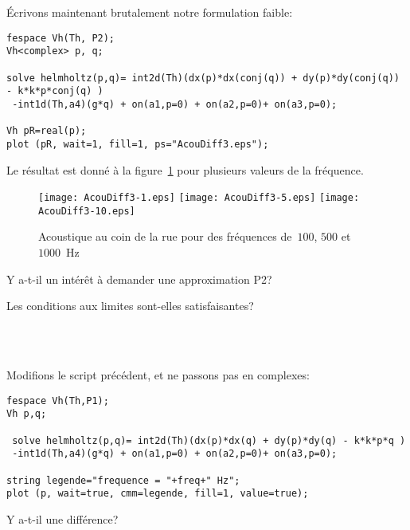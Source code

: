 \medskip
Écrivons maintenant brutalement notre formulation faible:
\begin{lstlisting}[firstnumber=last]
fespace Vh(Th, P2);
Vh<complex> p, q;

solve helmholtz(p,q)= int2d(Th)(dx(p)*dx(conj(q)) + dy(p)*dy(conj(q)) - k*k*p*conj(q) )
 -int1d(Th,a4)(g*q) + on(a1,p=0) + on(a2,p=0)+ on(a3,p=0);
 
Vh pR=real(p);
plot (pR, wait=1, fill=1, ps="AcouDiff3.eps");
\end{lstlisting}
Le résultat est donné à la figure~\ref{Fig-AcouDiff3} pour plusieurs valeurs de la fréquence.
\begin{figure}[h!]
\centering
   \texttt{[image: AcouDiff3-1.eps]}\hfill
   \texttt{[image: AcouDiff3-5.eps]}\hfill
   \texttt{[image: AcouDiff3-10.eps]}
\caption{Acoustique au coin de la rue pour des fréquences de~$100$, $500$ et $1000$~Hz}\label{Fig-AcouDiff3}
\end{figure}

\medskip
Y a-t-il un intérêt à demander une approximation P2?
\begin{flushright}
\end{flushright}

Les conditions aux limites sont-elles satisfaisantes?
\begin{flushright}
\\ 
\\
\end{flushright}

\medskip
Modifions le script précédent, et ne passons pas en complexes:
\begin{lstlisting}[firstnumber=14]
fespace Vh(Th,P1);
Vh p,q;

 solve helmholtz(p,q)= int2d(Th)(dx(p)*dx(q) + dy(p)*dy(q) - k*k*p*q )
 -int1d(Th,a4)(g*q) + on(a1,p=0) + on(a2,p=0)+ on(a3,p=0);

string legende="frequence = "+freq+" Hz";
plot (p, wait=true, cmm=legende, fill=1, value=true);
\end{lstlisting}

\medskip
Y a-t-il une différence?
\begin{flushright}
\\
\end{flushright}

